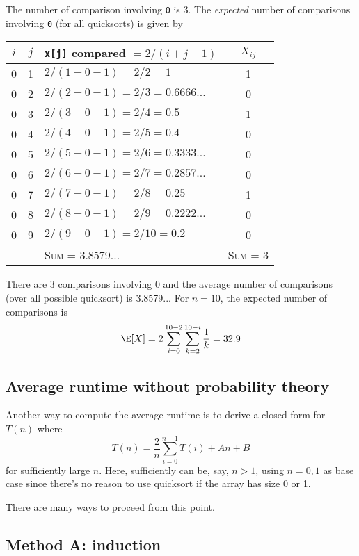 The number of comparison involving \verb!0! is 3.
The \textit{expected} number of comparisons involving \verb!0!
(for all quicksorts) is
given by
\begin{longtable}{|c|c|l|c|}
  \hline
  $i$ & $j$ & \texttt{x[j]} compared $= 2/(i+j-1)$ & $X_{ij}$ \\
  \hline
  0 & 1 & $2/(1 - 0 + 1) = 2/2 = 1$         & 1 \\
  0 & 2 & $2/(2 - 0 + 1) = 2/3 = 0.6666...$ & 0 \\
  0 & 3 & $2/(3 - 0 + 1) = 2/4 = 0.5$       & 1 \\
  0 & 4 & $2/(4 - 0 + 1) = 2/5 = 0.4$       & 0 \\
  0 & 5 & $2/(5 - 0 + 1) = 2/6 = 0.3333...$ & 0 \\
  0 & 6 & $2/(6 - 0 + 1) = 2/7 = 0.2857...$ & 0 \\
  0 & 7 & $2/(7 - 0 + 1) = 2/8 = 0.25$      & 1 \\
  0 & 8 & $2/(8 - 0 + 1) = 2/9 = 0.2222...$ & 0 \\
  0 & 9 & $2/(9 - 0 + 1) = 2/10 = 0.2$      & 0 \\
  \hline \hline
    &   & \textsc{Sum} = $3.8579...$   & \textsc{Sum} = 3 \\
  \hline
\end{longtable}
There are 3 comparisons involving 0 and
the average number of comparisons (over all possible
quicksort) is 3.8579...
For $n = 10$, the expected number of comparisons is
\[
  \E[X] =
  2\sum_{i=0}^{10-2} \sum_{k=2}^{10 - i} \frac{1}{k}  = 32.9
\]



\subsection{Average runtime without probability theory}
Another way to compute the average runtime is to
derive a closed form for $T(n)$ where
\[
  T(n) = \frac{2}{n} \sum_{i = 0}^{n - 1} T(i) + An + B
\]
for sufficiently large $n$.
Here, sufficiently can be, say, $n > 1$, using
$n = 0, 1$ as base case since there's no reason to
use quicksort if the array has size 0 or 1.

There are many ways to proceed from this point.

\subsection{Method A: induction}

